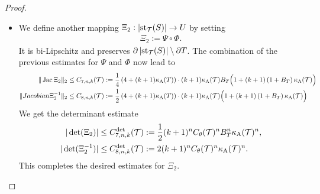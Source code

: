 \documentclass[10pt,a4paper]{article}
\begin{document}
\begin{proof}
\begin{itemize}
        
        
        
        





        
        
        
        
        
        
        \item 
        We define another mapping $ \Xi_{2} : \left| \operatorname{st}_{{\mathcal T}}(S) \right| \rightarrow U $ by setting 
        \begin{align*}
            \Xi_{2} := \Psi \circ \Phi.
        \end{align*}
        It is bi-Lipschitz and preserves $\partial\left| \operatorname{st}_{{\mathcal T}}(S) \right| \setminus \partial T$. 
        The combination of the previous estimates for $\Psi$ and $\Phi$ now lead to 
        \begin{align*}
            \|  \operatorname{{\rm Jac}} \Xi_{2}  \|_{2}
            &\leq 
            C_{7,n,k}({\mathcal T})
            :=
            \frac 1 4
            \left( 4 + (k+1) \kappa_{\rm A}(T) \right)
            \cdot 
            (k+1) 
            \kappa_{\rm A}({\mathcal T})
            B_{T}
            \Big( 
                1 
                + 
                (k+1) 
                \left( 1 + B_{T} \right)
                \kappa_{\rm A}({\mathcal T})
            \Big)            
            \\
            \|  Jacobian \Xi_{2}^{-1}  \|_{2}
            &\leq  
            C_{8,n,k}({\mathcal T})
            :=
            \frac 1 2
            \left( 4 + (k+1) \kappa_{\rm A}(T) \right)
            \cdot 
            (k+1) 
            \kappa_{\rm A}({\mathcal T})
            \Big( 
                1 
                + 
                (k+1) 
                \left( 1 + B_{T} \right)
                \kappa_{\rm A}({\mathcal T})
            \Big)            
        \end{align*}
        We get the determinant estimate 
        \begin{align*}
            |\det(\Xi_{2})|
            &\leq 
            C^{\det}_{7,n,k}({\mathcal T})
            :=
            \frac 1 2 
            (k+1)^{n}
            C_\theta({\mathcal T})^{n}
            B_{T}^{n}
            \kappa_{\rm A}({\mathcal T})^{n}
            ,
            \\
            |\det(\Xi_{2}^{-1})|
            &\leq 
            C^{\det}_{8,n,k}({\mathcal T})
            :=
            2
            (k+1)^{n}
            C_\theta({\mathcal T})^{n}
            \kappa_{\rm A}({\mathcal T})^{n}
            .
        \end{align*}
        This completes the desired estimates for $\Xi_{2}$. 
        

\end{itemize}
\end{proof}
\end{document}
